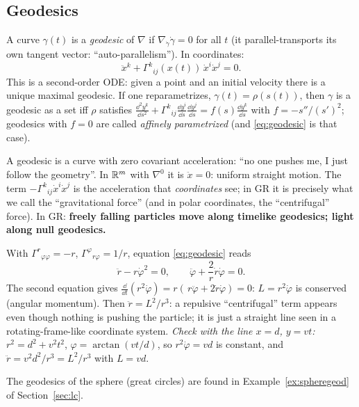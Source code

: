 \subsection{Geodesics}
\begin{formal}[{geodesic}]
A curve $\gamma(t)$ is a \emph{geodesic} of $\nabla$ if $\nabla_{\dot\gamma}\dot\gamma=0$ for all $t$ (it parallel-transports its own tangent vector: ``auto-parallelism''). In coordinates:
\begin{equation}\label{eq:geodesic}
\ddot x^k+\Gamma^k{}_{ij}(x(t))\,\dot x^i\dot x^j=0 .
\end{equation}
This is a second-order ODE: given a point and an initial velocity there is a unique maximal geodesic. If one reparametrizes, $\gamma(t)=\rho(s(t))$, then $\gamma$ is a geodesic as a set iff $\rho$ satisfies $\frac{\dd^2y^k}{\dd s^2}+\Gamma^k{}_{ij}\frac{\dd y^i}{\dd s}\frac{\dd y^j}{\dd s}=f(s)\frac{\dd y^k}{\dd s}$ with $f=-s''/(s')^2$; geodesics with $f=0$ are called \emph{affinely parametrized} (and \eqref{eq:geodesic} is that case).
\end{formal}
\begin{intuition}
A geodesic is a curve with zero covariant acceleration: ``no one pushes me, I just follow the geometry''. In $\mathbb{R}^m$ with $\nabla^0$ it is $\ddot x=0$: uniform straight motion. The term $-\Gamma^k{}_{ij}\dot x^i\dot x^j$ is the acceleration that \emph{coordinates} see; in GR it is precisely what we call the ``gravitational force'' (and in polar coordinates, the ``centrifugal'' force). In GR: \textbf{freely falling particles move along timelike geodesics; light along null geodesics.}
\end{intuition}

\begin{example}\label{ex:polarstraight}
With $\Gamma^r{}_{\varphi\varphi}=-r$, $\Gamma^\varphi{}_{r\varphi}=1/r$, equation \eqref{eq:geodesic} reads
\[
\ddot r-r\dot\varphi^2=0,\qquad \ddot\varphi+\frac2r\dot r\dot\varphi=0 .
\]
The second equation gives $\frac{\dd}{\dd t}(r^2\dot\varphi)=r(\,r\ddot\varphi+2\dot r\dot\varphi)=0$: $L=r^2\dot\varphi$ is conserved (angular momentum). Then $\ddot r=L^2/r^3$: a repulsive ``centrifugal'' term appears even though nothing is pushing the particle; it is just a straight line seen in a rotating-frame-like coordinate system. \emph{Check with the line $x=d$, $y=vt$:} $r^2=d^2+v^2t^2$, $\varphi=\arctan(vt/d)$, so $r^2\dot\varphi=vd$ is constant, and $\ddot r=v^2d^2/r^3=L^2/r^3$ with $L=vd$. \checkmark
\end{example}

The geodesics of the sphere (great circles) are found in Example~\ref{ex:spheregeod} of Section~\ref{sec:lc}.

